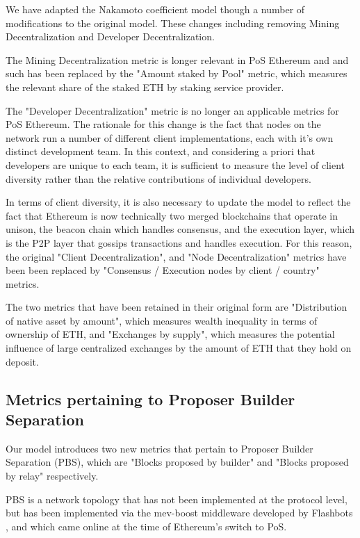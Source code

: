 \documentclass[conference]{IEEEtran}
\begin{document}
We have adapted the Nakamoto coefficient model though a number of modifications to the original model.  These changes including removing Mining Decentralization and Developer Decentralization. 

The Mining Decentralization metric is longer relevant in PoS Ethereum and and such has been replaced by the "Amount staked by Pool" metric, which measures the relevant share of the staked ETH by staking service provider. 

The "Developer Decentralization" metric is no longer an applicable metrics for PoS Ethereum. The rationale for this change is the fact that nodes on the network run a number of different client implementations, each with it's own distinct development team.  In this context, and considering a priori that developers are unique to each team, it is sufficient to measure the level of client diversity rather than the relative contributions of individual developers. 

In terms of client diversity, it is also necessary to update the model to reflect the fact that Ethereum is now technically two merged blockchains that operate in unison, the beacon chain which handles consensus, and the execution layer, which is the P2P layer that gossips transactions and handles execution.  For this reason, the original "Client Decentralization", and "Node Decentralization" metrics have been been replaced by "Consensus / Execution nodes by client / country" metrics. 

The two metrics that have been retained in their original form are "Distribution of native asset by amount", which measures wealth inequality in terms of ownership of ETH, and "Exchanges by supply", which measures the potential influence of large centralized exchanges by the amount of ETH that they hold on deposit.

\subsection{Metrics pertaining to Proposer Builder Separation}

Our model introduces two new metrics that pertain to Proposer Builder Separation (PBS), which are "Blocks proposed by builder" and "Blocks proposed by relay" respectively.

PBS is a network topology that has not been implemented at the protocol level, but has been implemented via the mev-boost middleware developed by Flashbots \cite{gosselin2021}, and which came online at the time of Ethereum's switch to PoS.
\end{document}

